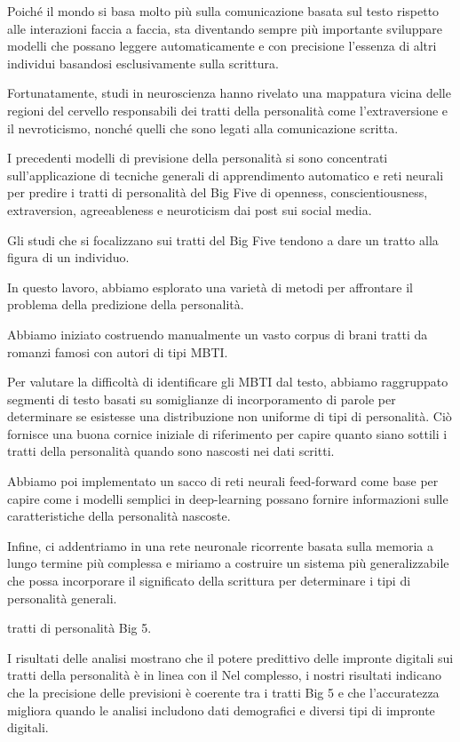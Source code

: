 Poiché il mondo si basa molto più sulla comunicazione basata sul testo rispetto alle interazioni faccia a faccia, sta diventando sempre più importante sviluppare modelli che possano leggere automaticamente e con precisione l'essenza di altri individui basandosi esclusivamente sulla scrittura. 

Fortunatamente, studi in neuroscienza hanno rivelato una mappatura vicina delle regioni del cervello responsabili dei tratti della personalità come l'extraversione e il nevroticismo, nonché quelli che sono legati alla comunicazione scritta.

I precedenti modelli di previsione della personalità si sono concentrati sull'applicazione di tecniche generali di apprendimento automatico e reti neurali per predire i tratti di personalità del Big Five di openness, conscientiousness, extraversion, agreeableness e neuroticism dai post sui social media. 

Gli studi che si focalizzano sui tratti del Big Five tendono a dare un tratto alla figura di un individuo.


In questo lavoro, abbiamo esplorato una varietà di metodi per affrontare il problema della predizione della personalità. 

Abbiamo iniziato costruendo manualmente un vasto corpus di brani tratti da romanzi famosi con autori di tipi MBTI. 

Per valutare la difficoltà di identificare gli MBTI dal testo, abbiamo raggruppato segmenti di testo basati su somiglianze di incorporamento di parole per determinare se esistesse una distribuzione non uniforme di tipi di personalità. Ciò fornisce una buona cornice iniziale di riferimento per capire quanto siano sottili i tratti della personalità quando sono nascosti nei dati scritti. 

Abbiamo poi implementato un sacco di reti neurali feed-forward come base per capire come i modelli semplici in deep-learning possano fornire informazioni sulle caratteristiche della personalità nascoste. 

Infine, ci addentriamo in una rete neuronale ricorrente basata sulla memoria a lungo termine più complessa e miriamo a costruire un sistema più generalizzabile che possa incorporare il significato della scrittura per determinare i tipi di personalità generali.



tratti di personalità Big 5.

I risultati delle analisi mostrano che il potere predittivo delle impronte digitali sui tratti della personalità è in linea con il 
Nel complesso, i nostri risultati indicano che la precisione delle previsioni è coerente tra i tratti Big 5 e che l'accuratezza migliora quando le analisi includono dati demografici e diversi tipi di impronte digitali.



